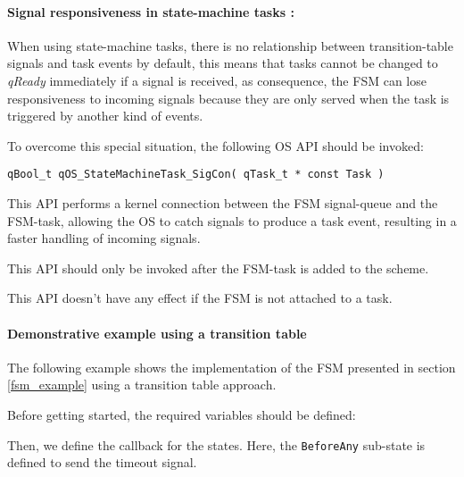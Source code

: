 \paragraph{Signal responsiveness in state-machine tasks :}

When using state-machine tasks, there is no relationship between transition-table signals and task events by default, this means that tasks cannot be changed to \textit{qReady} immediately if a signal is received, as consequence, the FSM can lose responsiveness to incoming signals because they are only served when the task is triggered by another kind of events. 

To overcome this special situation, the following OS API should be invoked:
\medskip

\begin{lstlisting}[style=CStyle]
qBool_t qOS_StateMachineTask_SigCon( qTask_t * const Task )
\end{lstlisting} 

This API performs a kernel connection between the FSM signal-queue and the FSM-task, allowing the OS to catch signals to produce a task event, resulting in a faster handling of incoming signals.
\medskip

\begin{tcolorbox}
\HandRight This API should only be invoked after the FSM-task is added to the scheme.
\end{tcolorbox}

\begin{tcolorbox}
\HandRight This API doesn't have any effect if the FSM is not attached to a task.
\end{tcolorbox}

\paragraph{Demonstrative example using a transition table}
The following example shows the implementation of the FSM presented in section \ref{fsm_example} using a transition table approach.

Before getting started, the required variables should be defined: 
\medskip



Then, we define the callback for the states. Here, the \lstinline{BeforeAny} sub-state is defined to send the timeout signal. 
\medskip



